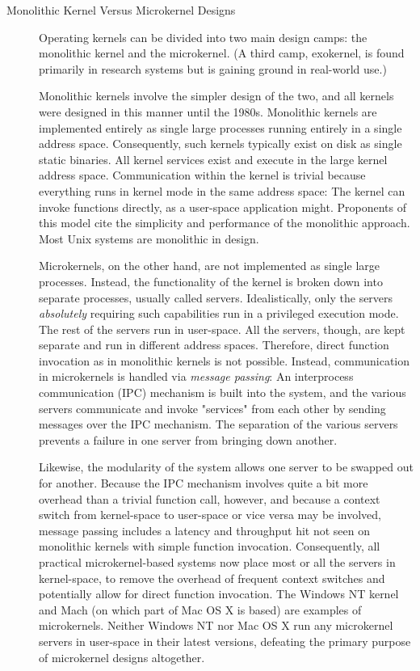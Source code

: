 \begin{description}
\item[Monolithic Kernel Versus Microkernel Designs] Operating kernels can be divided into
  two main design camps: the monolithic kernel and the microkernel. (A third camp,
  exokernel, is found primarily in research systems but is gaining ground in real-world
  use.)

  Monolithic kernels involve the simpler design of the two, and all kernels were designed
  in this manner until the 1980s. Monolithic kernels are implemented entirely as single
  large processes running entirely in a single address space. Consequently, such kernels
  typically exist on disk as single static binaries. All kernel services exist and execute
  in the large kernel address space. Communication within the kernel is trivial because
  everything runs in kernel mode in the same address space: The kernel can invoke
  functions directly, as a user-space application might. Proponents of this model cite the
  simplicity and performance of the monolithic approach. Most Unix systems are monolithic
  in design.

  Microkernels, on the other hand, are not implemented as single large processes. Instead,
  the functionality of the kernel is broken down into separate processes, usually called
  servers. Idealistically, only the servers \emph{absolutely} requiring such capabilities
  run in a privileged execution mode. The rest of the servers run in user-space. All the
  servers, though, are kept separate and run in different address spaces. Therefore,
  direct function invocation as in monolithic kernels is not possible. Instead,
  communication in microkernels is handled via \emph{message passing}: An interprocess
  communication (IPC) mechanism is built into the system, and the various servers
  communicate and invoke "services" from each other by sending messages over the IPC
  mechanism. The separation of the various servers prevents a failure in one server from
  bringing down another.

  Likewise, the modularity of the system allows one server to be swapped out for
  another. Because the IPC mechanism involves quite a bit more overhead than a trivial
  function call, however, and because a context switch from kernel-space to user-space or
  vice versa may be involved, message passing includes a latency and throughput hit not
  seen on monolithic kernels with simple function invocation. Consequently, all practical
  microkernel-based systems now place most or all the servers in kernel-space, to remove
  the overhead of frequent context switches and potentially allow for direct function
  invocation. The Windows NT kernel and Mach (on which part of Mac OS X is based) are
  examples of microkernels. Neither Windows NT nor Mac OS X run any microkernel servers in
  user-space in their latest versions, defeating the primary purpose of microkernel
  designs altogether.


\end{description}
